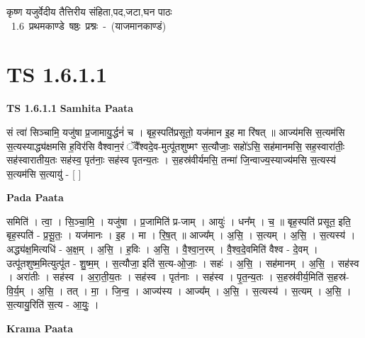 \documentclass[17pt]{extarticle}
\begin{document}
\begin{titlepage}
    \begin{center}
 
\begin{sanskrit}
    { \Large
    कृष्ण यजुर्वेदीय तैत्तिरीय संहिता,पद,जटा,घन पाठः 
    }
    \\
    \vspace{2.5cm}
    \mbox{ \Large
    1.6     प्रथमकाण्डे षष्ठः प्रश्नः - (याजमानकाण्डं)   }
\end{sanskrit}
\end{center}

\end{titlepage}
\tableofcontents
{}
\pagebreak


\section{ TS 1.6.1.1 }

\textbf{TS 1.6.1.1 } \newline
\textbf{Samhita Paata} \newline

सं त्वा॑ सिञ्चामि॒ यजु॑षा प्र॒जामायु॒र्द्धनं॑ च । बृह॒स्पति॑प्रसूतो॒ यज॑मान इ॒ह मा रि॑षत् ॥ आज्य॑मसि स॒त्यम॑सि स॒त्यस्याद्ध्य॑क्षमसि ह॒विर॑सि वैश्वान॒रं ॅवै᳚श्वदे॒व-मुत्पू॑तशुष्मꣳ स॒त्यौजाः॒ सहो॑ऽसि॒ सह॑मानमसि॒ सह॒स्वारा॑तीः॒ सह॑स्वारातीय॒तः सह॑स्व॒ पृत॑नाः॒ सह॑स्व पृतन्य॒तः । स॒हस्र॑वीर्यमसि॒ तन्मा॑ जि॒न्वाज्य॒स्याज्य॑मसि स॒त्यस्य॑ स॒त्यम॑सि स॒त्यायु॑ - [ ] \newline

\textbf{Pada Paata} \newline

समिति॑ । त्वा॒ । सि॒ञ्चा॒मि॒ । यजु॑षा । प्र॒जामिति॑ प्र-जाम् । आयुः॑ । धन᳚म् । च॒ ॥ बृह॒स्पति॑ प्रसूत॒ इति॒ बृह॒स्पति॑ - प्र॒सू॒तः॒ । यज॑मानः । इ॒ह । मा । रि॒ष॒त् ॥ आज्य᳚म् । अ॒सि॒ । स॒त्यम् । अ॒सि॒ । स॒त्यस्य॑ । अद्ध्य॑क्ष॒मित्यधि॑ - अ॒क्ष॒म् । अ॒सि॒ । ह॒विः । अ॒सि॒ । वै॒श्वा॒न॒रम् । वै॒श्व॒दे॒वमिति॑ वैश्व - दे॒वम् । उत्पू॑तशुष्म॒मित्युत्पू॑त - शु॒ष्म॒म् । स॒त्यौजा॒ इति॑ स॒त्य-ओ॒जाः॒ । सहः॑ । अ॒सि॒ । सह॑मानम् । अ॒सि॒ । सह॑स्व । अरा॑तीः । सह॑स्व । अ॒रा॒ती॒य॒तः । सह॑स्व । पृत॑नाः । सह॑स्व । पृ॒त॒न्य॒तः । स॒हस्र॑वीर्य॒मिति॑ स॒हस्र॑-वि॒र्य॒म् । अ॒सि॒ । तत् । मा॒ । जि॒न्व॒ । आज्य॑स्य । आज्य᳚म् । अ॒सि॒ । स॒त्यस्य॑ । स॒त्यम् । अ॒सि॒ । स॒त्यायु॒रिति॑ स॒त्य - आ॒युः॒ ।  \newline


\textbf{Krama Paata} \newline
\end{document}
